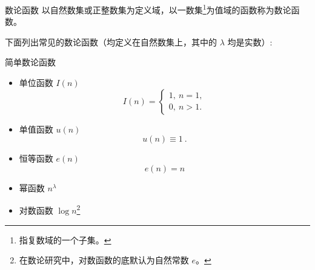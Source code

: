 

\begin{issues}
\issueDraft
\issueMissDepend
\end{issues}

\begin{definition}{数论函数}
以自然数集或正整数集为定义域，以一数集\footnote{指复数域的一个子集。}为值域的函数称为数论函数。
\end{definition}

下面列出常见的数论函数（均定义在自然数集上，其中的 $\lambda$ 均是实数）:
\begin{example}{简单数论函数}
\begin{itemize}
\item 单位函数 $I(n)$
\begin{equation}
I(n) =
\begin{cases}
1,\ n = 1,\\
0,\ n > 1.
\end{cases}
\end{equation}
\item 单值函数 $u(n)$
\begin{equation}
u(n)\equiv1~.
\end{equation}
\item 恒等函数 $e(n)$
\begin{equation}
e(n)=n
\end{equation}
\item 幂函数 $n^\lambda$
\item 对数函数 $\log n$\footnote{在数论研究中，对数函数的底默认为自然常数 $e$。}
\end{itemize}
\end{example}
